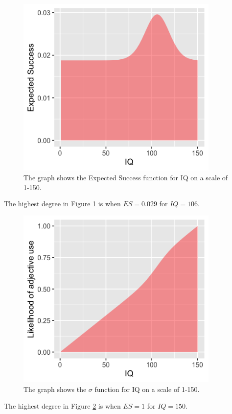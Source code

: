 \documentclass[11pt,a4paper,oneside]{article}
\begin{document}
\begin{figure}[H]
    \centering
    \includegraphics[width=100mm]{figs/Question_2_IQ_es.png}
    \caption{The graph shows the Expected Success function for IQ on a scale of 1-150.}
  \label{fig:q2_iq_es}
\end{figure}

The highest degree in Figure \ref{fig:q2_iq_es} is when $ES = 0.029$ for $IQ = 106$.


\begin{figure}[H]
    \centering
    \includegraphics[width=100mm]{figs/Question_2_IQ_sigma.png}
    \caption{The graph shows the $\sigma$ function for IQ on a scale of 1-150.}
  \label{fig:q2_iq_sigma}
\end{figure}

The highest degree in Figure \ref{fig:q2_iq_sigma} is when $ES = 1$ for $IQ = 150$.
\end{document}
